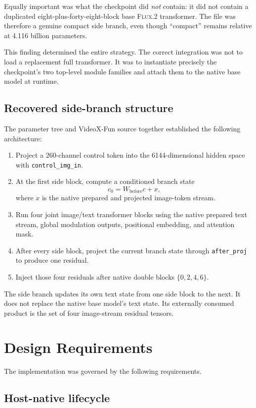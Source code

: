 \documentclass[11pt]{article}
\newcommand{\FluxTwo}{\textsc{Flux.2}}
\newcommand{\code}[1]{\texttt{#1}}
\begin{document}
Equally important was what the checkpoint did \emph{not} contain: it did not contain a duplicated eight-plus-forty-eight-block base \FluxTwo{} transformer. The file was therefore a genuine compact side branch, even though ``compact'' remains relative at 4.116 billion parameters.

This finding determined the entire strategy. The correct integration was not to load a replacement full transformer. It was to instantiate precisely the checkpoint's two top-level module families and attach them to the native base model at runtime.

\subsection{Recovered side-branch structure}

The parameter tree and VideoX-Fun source together established the following architecture:

\begin{enumerate}
  \item Project a 260-channel control token into the 6144-dimensional hidden space with \code{control\_img\_in}.
  \item At the first side block, compute a conditioned branch state
  \[
      c_0 = W_{\mathrm{before}}c + x,
  \]
  where $x$ is the native prepared and projected image-token stream.
  \item Run four joint image/text transformer blocks using the native prepared text stream, global modulation outputs, positional embedding, and attention mask.
  \item After every side block, project the current branch state through \code{after\_proj} to produce one residual.
  \item Inject those four residuals after native double blocks $\{0,2,4,6\}$.
\end{enumerate}

The side branch updates its own text state from one side block to the next. It does not replace the native base model's text state. Its externally consumed product is the set of four image-stream residual tensors.

\section{Design Requirements}

The implementation was governed by the following requirements.

\subsection{Host-native lifecycle}
\end{document}
